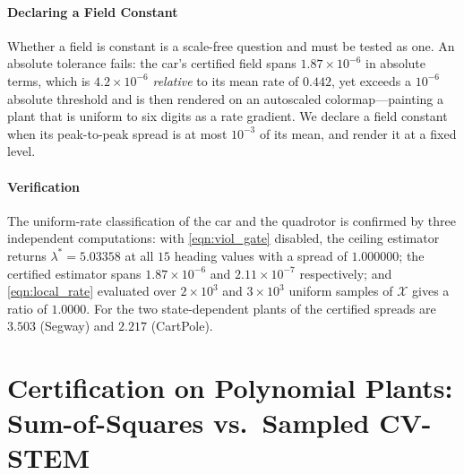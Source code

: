 \documentclass[lettersize,journal]{IEEEtran}
\begin{document}
\paragraph{Declaring a Field Constant}
Whether a field is constant is a scale-free question and must be tested as one.
An absolute tolerance fails: the car's certified field spans $1.87\times10^{-6}$
in absolute terms, which is $4.2\times10^{-6}$ \emph{relative} to its mean rate
of $0.442$, yet exceeds a $10^{-6}$ absolute threshold and is then rendered on
an autoscaled colormap---painting a plant that is uniform to six digits as a
rate gradient. We declare a field constant when its
peak-to-peak spread is at most $10^{-3}$ of its mean, and render it at a fixed
level.

\paragraph{Verification}
The uniform-rate classification of the car and the quadrotor is confirmed by
three independent computations: with \eqref{eqn:viol_gate} disabled, the ceiling
estimator returns $\lambda^*=5.03358$ at all $15$ heading values with a spread
of $1.000000$; the certified estimator spans $1.87\times10^{-6}$ and
$2.11\times10^{-7}$ respectively; and \eqref{eqn:local_rate} evaluated over
$2\times10^3$ and $3\times10^3$ uniform samples of $\mathcal{X}$ gives a ratio
of $1.0000$. For the two state-dependent plants of
 the certified spreads are $3.503$ (Segway)
and $2.217$ (CartPole).


\section{Certification on Polynomial Plants: Sum-of-Squares vs.\ Sampled CV-STEM}
\label{app:sos_vs_cvstem}
\end{document}
